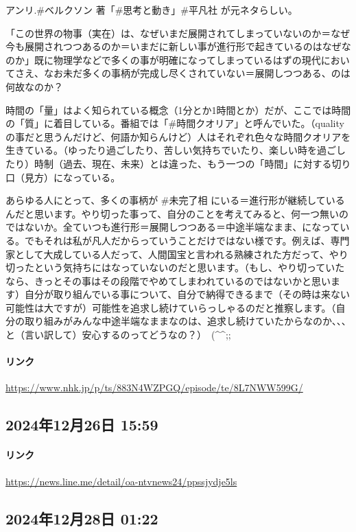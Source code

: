 アンリ.\#ベルクソン 著「\#思考と動き」\#平凡社 が元ネタらしい。

「この世界の物事（実在）は、なぜいまだ展開されてしまっていないのか＝なぜ今も展開されつつあるのか＝いまだに新しい事が進行形で起きているのはなぜなのか」既に物理学などで多くの事が明確になってしまっているはずの現代においてさえ、なお未だ多くの事柄が完成し尽くされていない＝展開しつつある、のは何故なのか？

時間の「量」はよく知られている概念（1分とか1時間とか）だが、ここでは時間の「質」に着目している。番組では「\#時間クオリア」と呼んでいた。（qualityの事だと思うんだけど、何語か知らんけど）人はそれぞれ色々な時間クオリアを生きている。（ゆったり過ごしたり、苦しい気持ちでいたり、楽しい時を過ごしたり）時制（過去、現在、未来）とは違った、もう一つの「時間」に対する切り口（見方）になっている。

あらゆる人にとって、多くの事柄が \#未完了相 にいる＝進行形が継続しているんだと思います。やり切った事って、自分のことを考えてみると、何一つ無いのではないか。全ていつも進行形＝展開しつつある＝中途半端なまま、になっている。でもそれは私が凡人だからっていうことだけではない様です。例えば、専門家として大成している人だって、人間国宝と言われる熟練された方だって、やり切ったという気持ちにはなっていないのだと思います。（もし、やり切っていたなら、きっとその事はその段階でやめてしまわれているのではないかと思います）自分が取り組んでいる事について、自分で納得できるまで（その時は来ない可能性は大ですが）可能性を追求し続けていらっしゃるのだと推察します。（自分の取り組みがみんな中途半端なままなのは、追求し続けていたからなのか、、、と（言い訳して）安心するのってどうなの？）　(\textasciicircum{}\textasciicircum{};;

\paragraph{リンク}
\url{https://www.nhk.jp/p/ts/883N4WZPGQ/episode/te/8L7NWW599G/}

\subsection*{2024年12月26日 15:59}

\paragraph{リンク}
\url{https://news.line.me/detail/oa-ntvnews24/ppssjydje5ls}

\subsection*{2024年12月28日 01:22}

